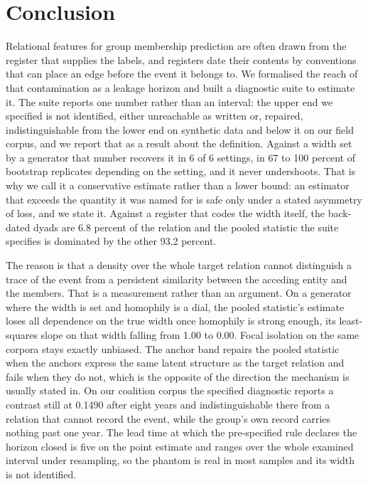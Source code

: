 \documentclass[twoside,11pt]{article}
\begin{document}
\section{Conclusion}

Relational features for group membership prediction are often drawn from the register that supplies the labels, and registers date their contents by conventions that can place an edge before the event it belongs to. We formalised the reach of that contamination as a leakage horizon and built a diagnostic suite to estimate it. The suite reports one number rather than an interval: the upper end we specified is not identified, either unreachable as written or, repaired, indistinguishable from the lower end on synthetic data and below it on our field corpus, and we report that as a result about the definition. Against a width set by a generator that number recovers it in 6 of 6 settings, in 67 to 100 percent of bootstrap replicates depending on the setting, and it never undershoots. That is why we call it a conservative estimate rather than a lower bound: an estimator that exceeds the quantity it was named for is safe only under a stated asymmetry of loss, and we state it. Against a register that codes the width itself, the back-dated dyads are 6.8 percent of the relation and the pooled statistic the suite specifies is dominated by the other 93.2 percent.

The reason is that a density over the whole target relation cannot distinguish a trace of the event from a persistent similarity between the acceding entity and the members. That is a measurement rather than an argument. On a generator where the width is set and homophily is a dial, the pooled statistic's estimate loses all dependence on the true width once homophily is strong enough, its least-squares slope on that width falling from 1.00 to 0.00. Focal isolation on the same corpora stays exactly unbiased. The anchor band repairs the pooled statistic when the anchors express the same latent structure as the target relation and fails when they do not, which is the opposite of the direction the mechanism is usually stated in. On our coalition corpus the specified diagnostic reports a contrast still at 0.1490 after eight years and indistinguishable there from a relation that cannot record the event, while the group's own record carries nothing past one year. The lead time at which the pre-specified rule declares the horizon closed is five on the point estimate and ranges over the whole examined interval under resampling, so the phantom is real in most samples and its width is not identified.
\end{document}

